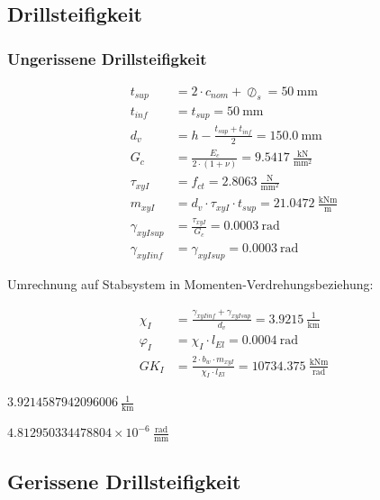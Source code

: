 \documentclass[
  11pt,
  letterpaper,
]{scrreprt}
\begin{document}
\subsection{Drillsteifigkeit}\label{drillsteifigkeit-1}

\subsubsection{Ungerissene
Drillsteifigkeit}\label{ungerissene-drillsteifigkeit-1}

\[
\begin{aligned}
t_{sup}& = 2 \cdot c_{nom} + \oslash_{s} = 50 \ \mathrm{mm} \\ 
t_{inf}& = t_{sup} = 50 \ \mathrm{mm} \\ 
d_{v}& = h - \frac{t_{sup} + t_{inf}}{2} = 150.0 \ \mathrm{mm} \\ 
G_{c}& = \frac{E_{c}}{2 \cdot \left(1 + \nu\right)} = 9.5417 \ \frac{\mathrm{kN}}{\mathrm{mm}^{2}} \\ 
\tau_{xy I}& = f_{ct} = 2.8063 \ \frac{\mathrm{N}}{\mathrm{mm}^{2}} \\ 
m_{xy I}& = d_{v} \cdot \tau_{xy I} \cdot t_{sup} = 21.0472 \ \frac{\mathrm{kNm}}{\mathrm{m}} \\ 
\gamma_{xy I sup}& = \frac{\tau_{xy I}}{G_{c}} = 0.0003 \ \mathrm{rad} \\ 
\gamma_{xy I inf}& = \gamma_{xy I sup} = 0.0003 \ \mathrm{rad} \end{aligned}
\]

Umrechnung auf Stabsystem in Momenten-Verdrehungsbeziehung:

\[
\begin{aligned}
\chi_{I}& = \frac{\gamma_{xy I inf} + \gamma_{xy I sup}}{d_{v}} = 3.9215 \ \frac{1}{\mathrm{km}} \\ 
\varphi_{I}& = \chi_{I} \cdot l_{El} = 0.0004 \ \mathrm{rad} \\ 
GK_{I}& = \frac{2 \cdot b_{w} \cdot m_{xy I}}{\chi_{I} \cdot l_{El}} = 10734.375 \ \frac{\mathrm{kNm}}{\mathrm{rad}} \end{aligned}
\]

$3.9214587942096006\ \frac{1}{\mathrm{km}}$

$4.812950334478804\times 10^{-6}\ \frac{\mathrm{rad}}{\mathrm{mm}}$

\subsection{Gerissene
Drillsteifigkeit}\label{gerissene-drillsteifigkeit-1}
\end{document}

